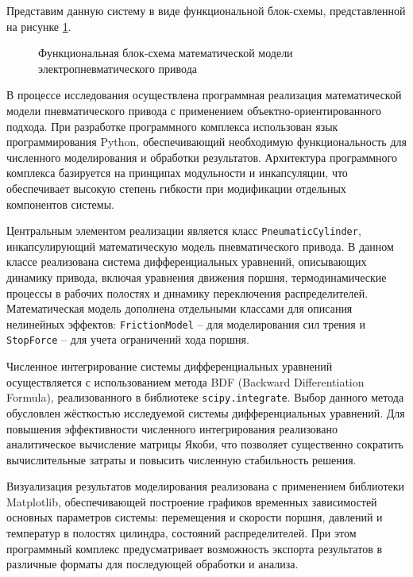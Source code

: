 Представим данную систему в виде функциональной блок-схемы, представленной на рисунке \ref{fig:ch2/block_diagram}.

\begin{figure}[ht]
    \caption{Функциональная блок-схема математической модели электропневматического привода}
    \label{fig:ch2/block_diagram}
\end{figure}

В процессе исследования осуществлена программная реализация математической модели пневматического привода с применением объектно-ориентированного подхода.
При разработке программного комплекса использован язык программирования Python, обеспечивающий необходимую функциональность для численного моделирования и
обработки результатов. Архитектура программного комплекса базируется на принципах модульности и инкапсуляции, что обеспечивает высокую степень гибкости при
модификации отдельных компонентов системы.

Центральным элементом реализации является класс \texttt{PneumaticCylinder}, инкапсулирующий математическую модель пневматического привода.
В данном классе реализована система дифференциальных уравнений, описывающих динамику привода, включая уравнения движения поршня,
термодинамические процессы в рабочих полостях и динамику переключения распределителей. Математическая модель дополнена отдельными
классами для описания нелинейных эффектов: \texttt{FrictionModel} -- для моделирования сил трения и \texttt{StopForce} -- для учета ограничений хода поршня.

Численное интегрирование системы дифференциальных уравнений осуществляется с использованием метода BDF (Backward Differentiation Formula),
реализованного в библиотеке \texttt{scipy.integrate}. Выбор данного метода обусловлен жёсткостью исследуемой системы дифференциальных
уравнений. Для повышения эффективности численного интегрирования реализовано аналитическое вычисление матрицы Якоби, что позволяет существенно
сократить вычислительные затраты и повысить численную стабильность решения.

Визуализация результатов моделирования реализована с применением библиотеки Matplotlib, обеспечивающей
построение графиков временных зависимостей основных параметров системы: перемещения и скорости поршня, давлений и температур
в полостях цилиндра, состояний распределителей. При этом программный комплекс предусматривает возможность экспорта результатов
в различные форматы для последующей обработки и анализа.

